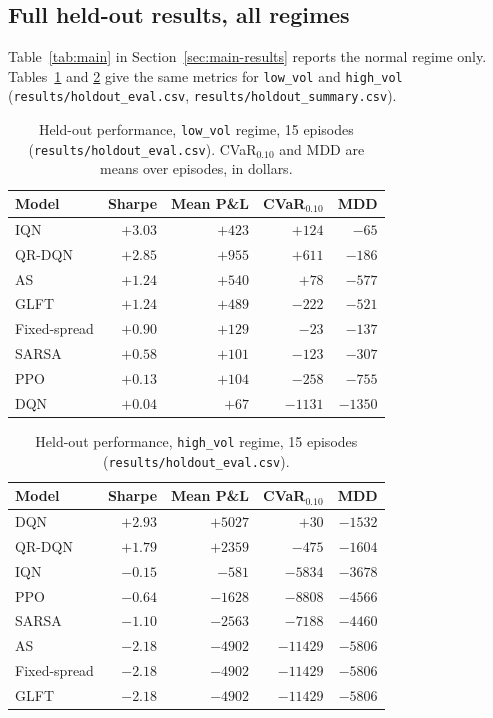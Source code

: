 \documentclass[10pt,twocolumn]{article}
\begin{document}
\subsection{Full held-out results, all regimes}
\label{sec:appendix-holdout}
Table~\ref{tab:main} in Section~\ref{sec:main-results} reports the normal regime only. Tables~\ref{tab:lowvol} and \ref{tab:highvol} give the same metrics for \texttt{low\_vol} and \texttt{high\_vol} (\texttt{results/holdout\_eval.csv}, \texttt{results/holdout\_summary.csv}).

\begin{table}[t]
\centering\footnotesize
\begin{tabular}{lrrrr}
\toprule
Model & Sharpe & Mean P\&L & CVaR$_{0.10}$ & MDD \\
\midrule
IQN          & $+3.03$ & $+423$  & $+124$  & $-65$   \\
QR-DQN       & $+2.85$ & $+955$  & $+611$  & $-186$  \\
AS           & $+1.24$ & $+540$  & $+78$   & $-577$  \\
GLFT         & $+1.24$ & $+489$  & $-222$  & $-521$  \\
Fixed-spread & $+0.90$ & $+129$  & $-23$   & $-137$  \\
SARSA        & $+0.58$ & $+101$  & $-123$  & $-307$  \\
PPO          & $+0.13$ & $+104$  & $-258$  & $-755$  \\
DQN          & $+0.04$ & $+67$   & $-1131$ & $-1350$ \\
\bottomrule
\end{tabular}
\caption{Held-out performance, \texttt{low\_vol} regime, 15 episodes (\texttt{results/holdout\_eval.csv}). CVaR$_{0.10}$ and MDD are means over episodes, in dollars.}
\label{tab:lowvol}
\end{table}

\begin{table}[t]
\centering\footnotesize
\begin{tabular}{lrrrr}
\toprule
Model & Sharpe & Mean P\&L & CVaR$_{0.10}$ & MDD \\
\midrule
DQN          & $+2.93$ & $+5027$ & $+30$    & $-1532$ \\
QR-DQN       & $+1.79$ & $+2359$ & $-475$   & $-1604$ \\
IQN          & $-0.15$ & $-581$  & $-5834$  & $-3678$ \\
PPO          & $-0.64$ & $-1628$ & $-8808$  & $-4566$ \\
SARSA        & $-1.10$ & $-2563$ & $-7188$  & $-4460$ \\
AS           & $-2.18$ & $-4902$ & $-11429$ & $-5806$ \\
Fixed-spread & $-2.18$ & $-4902$ & $-11429$ & $-5806$ \\
GLFT         & $-2.18$ & $-4902$ & $-11429$ & $-5806$ \\
\bottomrule
\end{tabular}
\caption{Held-out performance, \texttt{high\_vol} regime, 15 episodes (\texttt{results/holdout\_eval.csv}).}
\label{tab:highvol}
\end{table}
\end{document}
